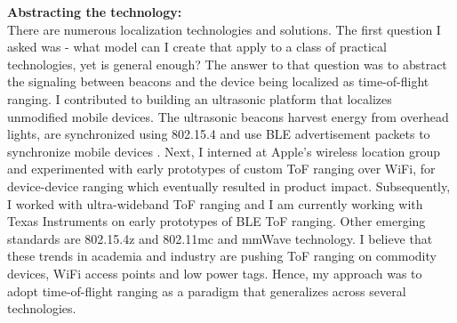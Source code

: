 \documentclass[10pt]{article}
\begin{document}
\textbf{Abstracting the technology: }\\
There are numerous localization technologies and solutions. The first question I asked was - what model can I create that apply to a class of practical technologies, yet is general enough? The answer to that question was to abstract the signaling between beacons and the device being localized as time-of-flight ranging.
I contributed to building an ultrasonic platform that localizes unmodified mobile devices. The ultrasonic beacons harvest energy from overhead lights, are synchronized using 802.15.4 and use BLE advertisement packets to synchronize mobile devices \cite{rtas-alps-platform, lazik2015alps,lazik2015alpsdemo}. Next, I interned at Apple's wireless location group and experimented with early prototypes of custom ToF ranging over WiFi, for device-device ranging which eventually resulted in product impact. Subsequently, I worked with ultra-wideband ToF ranging and I am currently working with Texas Instruments on early prototypes of BLE ToF ranging. Other emerging standards are 802.15.4z and 802.11mc and mmWave technology. I believe that these trends in academia and industry are pushing ToF ranging on commodity devices, WiFi access points and low power tags. Hence, my approach was to adopt time-of-flight ranging as a paradigm that generalizes across several technologies. %

\end{document}
